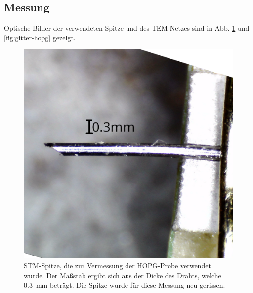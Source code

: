 \documentclass{article}
\begin{document}
\subsection{Messung}
Optische Bilder der verwendeten Spitze und des TEM-Netzes sind in Abb. \ref{fig:spitze-2} und \ref{fig:gitter-hopg} gezeigt.
\begin{figure}[h]
    \centering
    \begin{minipage}{0.49\textwidth}
        \centering
        \includegraphics[width=\textwidth]{Spitze2}
        \caption{STM-Spitze, die zur Vermessung der HOPG-Probe verwendet wurde.
        Der Maßstab ergibt sich aus der Dicke des Drahts, welche \SI{0.3}{\mm} beträgt.
        Die Spitze wurde für diese Messung neu gerissen.}
        \label{fig:spitze-2}
    \end{minipage}
    \hfill
    \begin{minipage}{0.49\textwidth}
        \centering

\end{minipage}
\end{figure}
\end{document}
